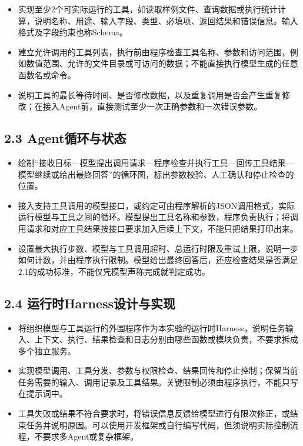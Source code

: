 \documentclass[UTF8,12pt,a4paper]{ctexart}
\begin{document}
\begin{itemize}
  \item 实现至少2个可实际运行的工具，如读取样例文件、查询数据或执行统计计算，说明名称、用途、输入字段、类型、必填项、返回结果和错误信息。输入格式及字段约束也称Schema。
  \item 建立允许调用的工具列表，执行前由程序检查工具名称、参数和访问范围，例如数值范围、允许的文件目录或可访问的数据；不能直接执行模型生成的任意函数名或命令。
  \item 说明工具的最长等待时间、是否修改数据，以及重复调用是否会产生重复修改；在接入Agent前，直接测试至少一次正确参数和一次错误参数。
\end{itemize}

\subsection*{2.3 Agent循环与状态}

\begin{itemize}
  \item 绘制“接收目标—模型提出调用请求—程序检查并执行工具—回传工具结果—模型继续或给出最终回答”的循环图，标出参数校验、人工确认和停止检查的位置。
  \item 接入支持工具调用的模型接口，或约定可由程序解析的JSON调用格式，实际运行模型与工具之间的循环。模型提出工具名称和参数，程序负责执行；将调用请求和对应工具结果按接口要求加入后续上下文，不能只把结果打印出来。
  \item 设置最大执行步数、模型与工具调用超时、总运行时限及重试上限，说明一步如何计数，并由程序执行限制。模型给出最终回答后，还应检查结果是否满足2.1的成功标准，不能仅凭模型声称完成就判定成功。
\end{itemize}

\subsection*{2.4 运行时Harness设计与实现}

\begin{itemize}
  \item 将组织模型与工具运行的外围程序作为本实验的运行时Harness，说明任务输入、上下文、执行、结果检查和日志分别由哪些函数或模块负责，不要求拆成多个独立服务。
  \item 实现模型调用、工具分发、参数与权限检查、结果回传和停止控制；保留当前任务需要的输入、调用记录及工具结果。关键限制必须由程序执行，不能只写在提示词中。
  \item 工具失败或结果不符合要求时，将错误信息反馈给模型进行有限次修正，或结束任务并说明原因。可以使用开发框架或自行编写代码，但须说明实际控制流程，不要求多Agent或复杂框架。
\end{itemize}
\end{document}
